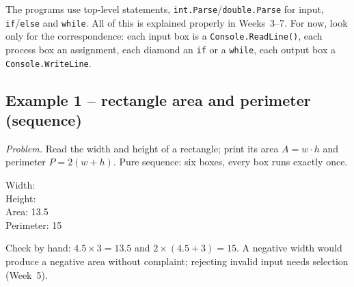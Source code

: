 \documentclass[11pt,a4paper]{article}
\begin{document}
\begin{notebox}
The programs use top-level statements, \texttt{int.Parse}/\texttt{double.Parse} for input, \texttt{if}/\texttt{else} and \texttt{while}. All of this is explained properly in Weeks~3--7. For now, look only for the correspondence: each input box is a \texttt{Console.ReadLine()}, each process box an assignment, each diamond an \texttt{if} or a \texttt{while}, each output box a \texttt{Console.WriteLine}.
\end{notebox}

\subsection{Example 1 -- rectangle area and perimeter (sequence)}
\emph{Problem.} Read the width and height of a rectangle; print its area $A = w\cdot h$ and perimeter $P = 2(w+h)$. Pure sequence: six boxes, every box runs exactly once.
\begin{center}
\begin{minipage}[c]{0.42\linewidth}\centering
{}
\end{minipage}\hfill
\begin{minipage}[c]{0.54\linewidth}
\begin{consolebox}
Width: \\ Height: \\ Area: 13.5\\ Perimeter: 15
\end{consolebox}
Check by hand: $4.5 \times 3 = 13.5$ and $2\times(4.5+3) = 15$. A negative width would produce a negative area without complaint; rejecting invalid input needs selection (Week~5).
\end{minipage}
\end{center}
\end{document}
